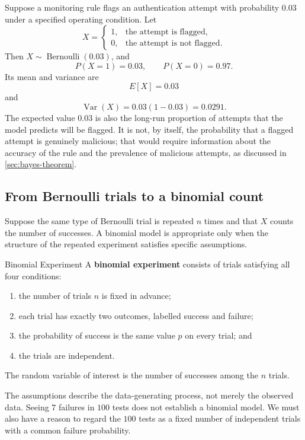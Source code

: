 \begin{example}\par
Suppose a monitoring rule flags an authentication attempt with probability $0.03$ under a specified operating condition. Let
\[
X=
\begin{cases}
1, & \text{the attempt is flagged},\\
0, & \text{the attempt is not flagged}.
\end{cases}
\]
Then $X\sim\operatorname{Bernoulli}(0.03)$, and
\[
P(X=1)=0.03,
\qquad
P(X=0)=0.97.
\]
Its mean and variance are
\[
E[X]=0.03
\]
and
\[
\operatorname{Var}(X)=0.03(1-0.03)=0.0291.
\]
The expected value $0.03$ is also the long-run proportion of attempts that the model predicts will be flagged. It is not, by itself, the probability that a flagged attempt is genuinely malicious; that would require information about the accuracy of the rule and the prevalence of malicious attempts, as discussed in \autoref{sec:bayes-theorem}.
\end{example}

\subsection{From Bernoulli trials to a binomial count}

Suppose the same type of Bernoulli trial is repeated $n$ times and that $X$ counts the number of successes. A binomial model is appropriate only when the structure of the repeated experiment satisfies specific assumptions.

\begin{definition}{Binomial Experiment}
    A \textbf{binomial experiment} consists of trials satisfying all four conditions:
    \begin{enumerate}
        \item the number of trials $n$ is fixed in advance;
        \item each trial has exactly two outcomes, labelled success and failure;
        \item the probability of success is the same value $p$ on every trial; and
        \item the trials are independent.
    \end{enumerate}
    The random variable of interest is the number of successes among the $n$ trials.
\end{definition}

The assumptions describe the data-generating process, not merely the observed data. Seeing $7$ failures in $100$ tests does not establish a binomial model. We must also have a reason to regard the $100$ tests as a fixed number of independent trials with a common failure probability.

